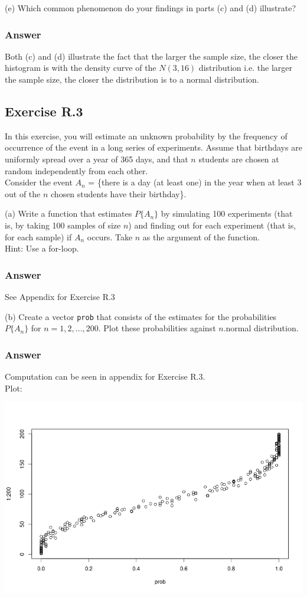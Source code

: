 \documentclass[12pt]{article}
\begin{document}
(e) Which common phenomenon do your findings in parts (c) and (d) illustrate?

\subsubsection*{Answer}

Both (c) and (d) illustrate the fact that the larger the sample size, the closer the histogram is with the density curve of the $N(3,16)$ distribution i.e. the larger the sample size, the closer the distribution is to a normal distribution.
\subsection*{Exercise R.3}
In this exercise, you will estimate an unknown probability by the frequency of occurrence of the event in a long series of experiments. Assume that birthdays are uniformly spread over a year of 365 days, and that $n$ students are chosen at random independently from each other. \\ Consider the event $A_{n}$ = \{there is a day (at least one) in the year when at least 3 out of the $n$ chosen students have their birthday\}.

(a) Write a function that estimates $P\{A_{n}\}$ by simulating 100 experiments (that is, by taking 100 samples of size $n$) and finding out for each experiment (that is, for each sample) if $A_n$ occurs. Take $n$ as the argument of the function.\\
Hint: Use a for-loop.
\subsubsection*{Answer}
See Appendix for Exercise R.3

(b) Create a vector \texttt{prob} that consists of the estimates for the probabilities $P\{A_{n}\}$ for $n = 1, 2, . . . , 200$. Plot these probabilities against $n$.normal distribution.
\subsubsection*{Answer}
Computation can be seen in appendix for Exercise R.3.\\
Plot:

\includegraphics[width=\textwidth]{Ex3Plot1}
\end{document}

